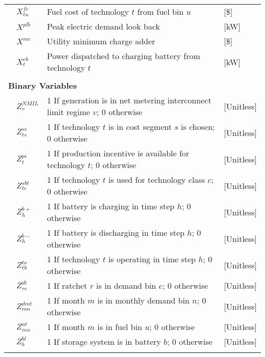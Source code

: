 \begin{longtable}{llll}
&$X^{fc}_{tu}$      &Fuel cost of technology $t$ from fuel bin $u$                                                                   &[\$]\\
&$X^{plb}$        &Peak electric demand look back                                                                                              &[kW]\\
&$X^{mc}$          &Utility minimum charge adder                                                                                       &[\$]\\
&$X^{eb}_t$         &Power dispatched to charging battery from technology $t$                                                           &[kW]\\
&&& \\
\multicolumn{4}{l}{\textbf{Binary Variables}}   \\ \hline
&$Z^{NMIL}_v$    &1 If generation is in net metering interconnect limit regime $v$; 0 otherwise                         &[Unitless]\\
&$Z^{sc}_{ts}$   &1 If technology $t$ is in cost segment  $s$ is chosen; 0 otherwise                   &[Unitless]\\
&$Z^{pi}_t$      &1 If production incentive is available for technology $t$; 0 otherwise    &[Unitless]\\
&$Z^{sbt}_{tc}$  &1 If technology $t$ is used for technology class $c$; 0 otherwise      & [Unitless]\\
&$Z^{b+}_h$      &1 If battery is charging in time step $h$; 0 otherwise         &[Unitless]\\
&$Z^{b-}_h$      &1 If battery is discharging in time step $h$; 0 otherwise      &[Unitless]\\
&$Z^{to}_{th}$   &1 If technology $t$ is operating in time step $h$; 0 otherwise            &[Unitless]\\
&$Z^{dt}_{re}$   &1 If ratchet $r$ is in demand bin $e$; 0 otherwise                        &[Unitless]\\
&$Z^{dmt}_{mn}$  &1 If month $m$ is in monthly demand bin $n$; 0 otherwise                  &[Unitless]\\
&$Z^{ut}_{mu}$   &1 If month $m$ is in fuel bin $u$; 0 otherwise               &[Unitless]\\
&$Z^{bl}_{b}$    &1 If storage system is in battery $b$; 0 otherwise                  &[Unitless]\\
&&&\\
\end{longtable}


